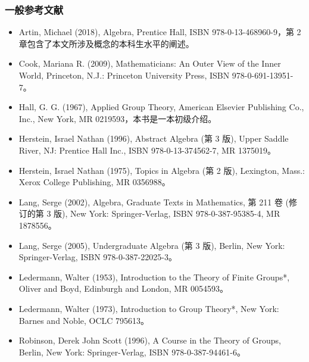 \subsubsection{一般参考文献 } 
\begin{itemize}
\item Artin, Michael (2018), Algebra, Prentice Hall, ISBN 978-0-13-468960-9，第 2 章包含了本文所涉及概念的本科生水平的阐述。  
\item Cook, Mariana R. (2009), Mathematicians: An Outer View of the Inner World, Princeton, N.J.: Princeton University Press, ISBN 978-0-691-13951-7。  
\item Hall, G. G. (1967), Applied Group Theory, American Elsevier Publishing Co., Inc., New York, MR 0219593，本书是一本初级介绍。  
\item Herstein, Israel Nathan (1996), Abstract Algebra (第 3 版), Upper Saddle River, NJ: Prentice Hall Inc., ISBN 978-0-13-374562-7, MR 1375019。  
\item Herstein, Israel Nathan (1975), Topics in Algebra (第 2 版), Lexington, Mass.: Xerox College Publishing, MR 0356988。  
\item Lang, Serge (2002), Algebra, Graduate Texts in Mathematics, 第 211 卷 (修订的第 3 版), New York: Springer-Verlag, ISBN 978-0-387-95385-4, MR 1878556。  
\item Lang, Serge (2005), Undergraduate Algebra (第 3 版), Berlin, New York: Springer-Verlag, ISBN 978-0-387-22025-3。  
\item Ledermann, Walter (1953), Introduction to the Theory of Finite Groups*, Oliver and Boyd, Edinburgh and London, MR 0054593。  
\item Ledermann, Walter (1973), Introduction to Group Theory*, New York: Barnes and Noble, OCLC 795613。  
\item Robinson, Derek John Scott (1996), A Course in the Theory of Groups, Berlin, New York: Springer-Verlag, ISBN 978-0-387-94461-6。
\end{itemize}

